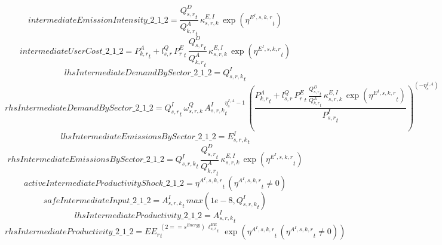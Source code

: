 \begin{dmath*}
intermediateEmissionIntensity\_2\_1\_2 = \frac{{{Q^{D}_{s,r}}}_{t}}{{{Q^{A}_{k,r}}}_{t}}\, {{\kappa^{E,I}_{s,r,k}}}\, \exp\left({{\eta^{E^{I},s,k,r}}}_{t}\right)
\end{dmath*}
\begin{dmath*}
intermediateUserCost\_2\_1\_2 = {{P^{A}_{k,r}}}_{t}+{{l^{Q}_{s,r}}}\, {{P^E_r}}_{t}\, \frac{{{Q^{D}_{s,r}}}_{t}}{{{Q^{A}_{k,r}}}_{t}}\, {{\kappa^{E,I}_{s,r,k}}}\, \exp\left({{\eta^{E^{I},s,k,r}}}_{t}\right)
\end{dmath*}
\begin{dmath*}
lhsIntermediateDemandBySector\_2\_1\_2 = {{Q^{I}_{s,r,k}}}_{t}
\end{dmath*}
\begin{dmath*}
rhsIntermediateDemandBySector\_2\_1\_2 = {{Q^{I}_{s,r}}}_{t}\, {{\omega^{Q}_{s,r,k}}}\, {{A^{I}_{s,r,k}}}_{t}^{{{\eta^{I,A}_{s}}}-1}\, \left(\frac{{{P^{A}_{k,r}}}_{t}+{{l^{Q}_{s,r}}}\, {{P^E_r}}_{t}\, \frac{{{Q^{D}_{s,r}}}_{t}}{{{Q^{A}_{k,r}}}_{t}}\, {{\kappa^{E,I}_{s,r,k}}}\, \exp\left({{\eta^{E^{I},s,k,r}}}_{t}\right)}{{{P^{I}_{s,r}}}_{t}}\right)^{\left(-{{\eta^{I,A}_{s}}}\right)}
\end{dmath*}
\begin{dmath*}
lhsIntermediateEmissionsBySector\_2\_1\_2 = {{E^I_{s,r,k}}}_{t}
\end{dmath*}
\begin{dmath*}
rhsIntermediateEmissionsBySector\_2\_1\_2 = {{Q^{I}_{s,r,k}}}_{t}\, \frac{{{Q^{D}_{s,r}}}_{t}}{{{Q^{A}_{k,r}}}_{t}}\, {{\kappa^{E,I}_{s,r,k}}}\, \exp\left({{\eta^{E^{I},s,k,r}}}_{t}\right)
\end{dmath*}
\begin{dmath*}
activeIntermediateProductivityShock\_2\_1\_2 = {{\eta^{A^{I},s,k,r}}}_{t}\, \left({{\eta^{A^{I},s,k,r}}}_{t}\neq 0\right)
\end{dmath*}
\begin{dmath*}
safeIntermediateInput\_2\_1\_2 = {{A^{I}_{s,r,k}}}_{t}\, max(1e-8,{{Q^{I}_{s,r,k}}}_{t})
\end{dmath*}
\begin{dmath*}
lhsIntermediateProductivity\_2\_1\_2 = {{A^{I}_{s,r,k}}}_{t}
\end{dmath*}
\begin{dmath*}
rhsIntermediateProductivity\_2\_1\_2 = {{EE_r}}_{t}^{\left(2=={{s^{Energy}}}\right)\, {{\ell^{EE}_{s,r}}}_{t}}\, \exp\left({{\eta^{A^{I},s,k,r}}}_{t}\, \left({{\eta^{A^{I},s,k,r}}}_{t}\neq 0\right)\right)
\end{dmath*}
